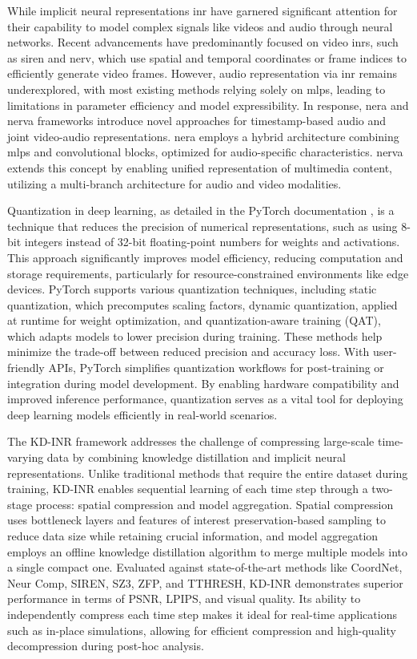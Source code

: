 \documentclass{ioereport}
\begin{document}
While implicit neural representations \gls{inr} have garnered significant attention for their capability to model complex signals like videos and audio through neural networks. Recent advancements have predominantly focused on video \gls{inr}s, such as \gls{siren} and \gls{nerv}, which use spatial and temporal coordinates or frame indices to efficiently generate video frames. However, audio representation via \gls{inr} remains underexplored, with most existing methods relying solely on \gls{mlp}s, leading to limitations in parameter efficiency and model expressibility. In response, \gls{nera} and \gls{nerva} frameworks \cite{NeRVA-2024} introduce novel approaches for timestamp-based audio and joint video-audio representations. \gls{nera} employs a hybrid architecture combining \gls{mlp}s and convolutional blocks, optimized for audio-specific characteristics. \gls{nerva} extends this concept by enabling unified representation of multimedia content, utilizing a multi-branch architecture for audio and video modalities.

Quantization in deep learning, as detailed in the PyTorch documentation \cite{pytorchQuantizationx2014}, is a technique that reduces the precision of numerical representations, such as using 8-bit integers instead of 32-bit floating-point numbers for weights and activations. This approach significantly improves model efficiency, reducing computation and storage requirements, particularly for resource-constrained environments like edge devices. PyTorch supports various quantization techniques, including static quantization, which precomputes scaling factors, dynamic quantization, applied at runtime for weight optimization, and quantization-aware training (QAT), which adapts models to lower precision during training. These methods help minimize the trade-off between reduced precision and accuracy loss. With user-friendly APIs, PyTorch simplifies quantization workflows for post-training or integration during model development. By enabling hardware compatibility and improved inference performance, quantization serves as a vital tool for deploying deep learning models efficiently in real-world scenarios.

The KD-INR framework \cite{DBLP:journals/tvcg/HanZB24} addresses the challenge of compressing large-scale time-varying data by combining knowledge distillation and implicit neural representations. Unlike traditional methods that require the entire dataset during training, KD-INR enables sequential learning of each time step through a two-stage process: spatial compression and model aggregation. Spatial compression uses bottleneck layers and features of interest preservation-based sampling to reduce data size while retaining crucial information, and model aggregation employs an offline knowledge distillation algorithm to merge multiple models into a single compact one. Evaluated against state-of-the-art methods like CoordNet, Neur Comp, SIREN, SZ3, ZFP, and TTHRESH, KD-INR demonstrates superior performance in terms of PSNR, LPIPS, and visual quality. Its ability to independently compress each time step makes it ideal for real-time applications such as in-place simulations, allowing for efficient compression and high-quality decompression during post-hoc analysis.
\end{document}
